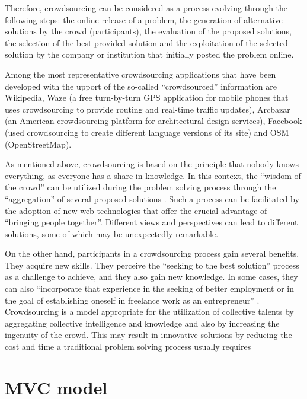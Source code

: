 Therefore, crowdsourcing can be considered as a process evolving through the following steps: the online release of a problem, the generation of alternative solutions by the crowd (participants), the evaluation of the proposed solutions, the selection of the best provided solution and the exploitation of the selected solution by the company or institution that initially posted the problem online.

 Among the most representative crowdsourcing applications that have been developed with the upport of the so-called “crowdsourced” information are Wikipedia, Waze (a free turn-by-turn GPS application for mobile phones that uses crowdsourcing to provide routing and real-time traffic updates), Arcbazar (an American crowdsourcing platform for architectural design services), Facebook (used crowdsourcing to create different language versions of its site) and OSM (OpenStreetMap).
 
  As mentioned above, crowdsourcing is based on the principle that nobody knows everything, as everyone has a share in knowledge. In this context, the “wisdom of the crowd” can be utilized during the problem solving process through the “aggregation” of several proposed solutions \cite{doi101177}. Such a process can be facilitated by the adoption of new web technologies that offer the crucial advantage of “bringing people together”. Different views and perspectives can lead to different solutions, some of which may be unexpectedly remarkable.
  
  
  On the other hand, participants in a crowdsourcing process gain several benefits. They acquire new skills. They perceive the “seeking to the best solution” process as a challenge to achieve, and they also gain new knowledge. In some cases, they can also “incorporate that experience in the seeking of better employment or in the goal of establishing oneself in freelance work as an entrepreneur” \cite{doi101177}. Crowdsourcing is a model appropriate for the utilization of collective talents by aggregating collective intelligence and knowledge and also by increasing the ingenuity of the crowd. This may result in innovative solutions by reducing the cost and time a traditional problem solving process usually requires \cite{doi101177}

\section{MVC model}
